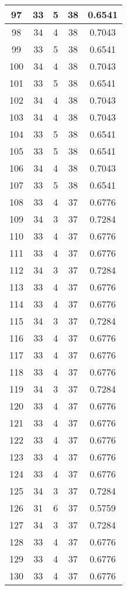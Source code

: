 \documentclass[letterpaper, 12pt]{article}
\begin{document}
\begin{longtable}{|c|c|c|c|c|}
\hline
97 & 33 & 5 & 38 & 0.6541 \\
\hline
98 & 34 & 4 & 38 & 0.7043 \\
\hline
99 & 33 & 5 & 38 & 0.6541 \\
\hline
100 & 34 & 4 & 38 & 0.7043 \\
\hline
101 & 33 & 5 & 38 & 0.6541 \\
\hline
102 & 34 & 4 & 38 & 0.7043 \\
\hline
103 & 34 & 4 & 38 & 0.7043 \\
\hline
104 & 33 & 5 & 38 & 0.6541 \\
\hline
105 & 33 & 5 & 38 & 0.6541 \\
\hline
106 & 34 & 4 & 38 & 0.7043 \\
\hline
107 & 33 & 5 & 38 & 0.6541 \\
\hline
108 & 33 & 4 & 37 & 0.6776 \\
\hline
109 & 34 & 3 & 37 & 0.7284 \\
\hline
110 & 33 & 4 & 37 & 0.6776 \\
\hline
111 & 33 & 4 & 37 & 0.6776 \\
\hline
112 & 34 & 3 & 37 & 0.7284 \\
\hline
113 & 33 & 4 & 37 & 0.6776 \\
\hline
114 & 33 & 4 & 37 & 0.6776 \\
\hline
115 & 34 & 3 & 37 & 0.7284 \\
\hline
116 & 33 & 4 & 37 & 0.6776 \\
\hline
117 & 33 & 4 & 37 & 0.6776 \\
\hline
118 & 33 & 4 & 37 & 0.6776 \\
\hline
119 & 34 & 3 & 37 & 0.7284 \\
\hline
120 & 33 & 4 & 37 & 0.6776 \\
\hline
121 & 33 & 4 & 37 & 0.6776 \\
\hline
122 & 33 & 4 & 37 & 0.6776 \\
\hline
123 & 33 & 4 & 37 & 0.6776 \\
\hline
124 & 33 & 4 & 37 & 0.6776 \\
\hline
125 & 34 & 3 & 37 & 0.7284 \\
\hline
126 & 31 & 6 & 37 & 0.5759 \\
\hline
127 & 34 & 3 & 37 & 0.7284 \\
\hline
128 & 33 & 4 & 37 & 0.6776 \\
\hline
129 & 33 & 4 & 37 & 0.6776 \\
\hline
130 & 33 & 4 & 37 & 0.6776 \\

\end{longtable}
\end{document}
